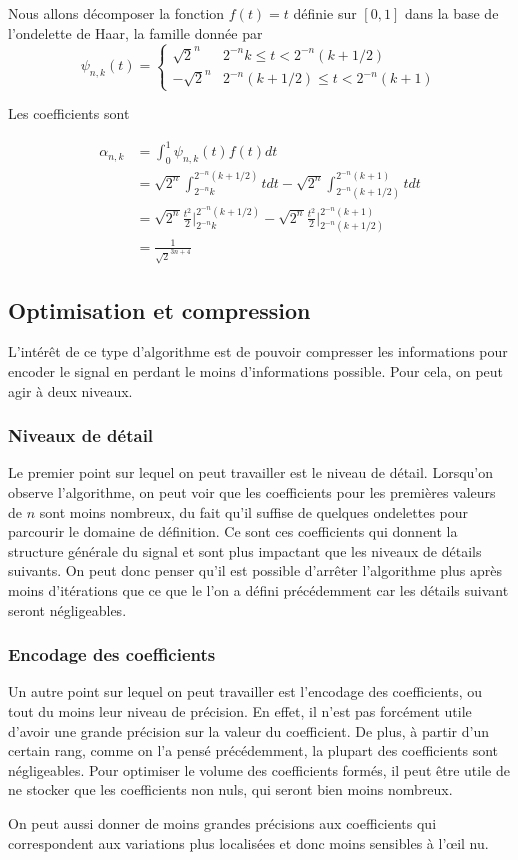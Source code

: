 \begin{myexmpl}
	Nous allons décomposer la fonction $f(t)=t$ définie sur $[0, 1]$ dans la base de l'ondelette de Haar, la famille donnée par
	$$\psi_{n, k}(t) = \left\{
	\begin{array}{cc}
		\sqrt{2}^n & 2^{-n}k \leqslant t < 2^{-n} (k+1/2) \\
		-\sqrt{2}^n & 2^{-n}(k+1/2) \leqslant t < 2^{-n} (k+1)
	\end{array}
	\right.$$
	
	Les coefficients sont 
	
	\begin{align*}
		\alpha_{n, k} &= \int_{0}^{1} \psi_{n, k}(t) f(t) dt \\
		&= \sqrt{2^n} \int_{2^{-n}k}^{2^{-n}(k+1/2)} t dt - \sqrt{2^n} \int_{2^{-n}(k+1/2)}^{2^{-n}(k+1)} t dt \\
		&= \sqrt{2^n} \frac{t^2}{2} \bigg \vert_{2^{-n} k}^{2^{-n}(k+1/2)} - \sqrt{2^n} \frac{t^2}{2} \bigg \vert_{2^{-n} (k+1/2)}^{2^{-n}(k+1)} \\
		&= \frac{1}{\sqrt{2}^{3n + 4}}
	\end{align*}
\end{myexmpl}



\subsection{Optimisation et compression}

L'intérêt de ce type d'algorithme est de pouvoir compresser les informations pour encoder le signal en perdant le moins d'informations possible. Pour cela, on peut agir à deux niveaux.

\subsubsection{Niveaux de détail}
	Le premier point sur lequel on peut travailler est le niveau de détail. Lorsqu'on observe l'algorithme, on peut voir que les coefficients pour les premières valeurs de $n$ sont moins nombreux, du fait qu'il suffise de quelques ondelettes pour parcourir le domaine de définition. Ce sont ces coefficients qui donnent la structure générale du signal et sont plus impactant que les niveaux de détails suivants. On peut donc penser qu'il est possible d'arrêter l'algorithme plus après moins d'itérations que ce que le l'on a défini précédemment car les détails suivant seront négligeables. 

\subsubsection{Encodage des coefficients}
	Un autre point sur lequel on peut travailler est l'encodage des coefficients, ou tout du moins leur niveau de précision. En effet, il n'est pas forcément utile d'avoir une grande précision sur la valeur du coefficient. De plus, à partir d'un certain rang, comme on l'a pensé précédemment, la plupart des coefficients sont négligeables. Pour optimiser le volume des coefficients formés, il peut être utile de ne stocker que les coefficients non nuls, qui seront bien moins nombreux.

	On peut aussi donner de moins grandes précisions aux coefficients qui correspondent aux variations plus localisées et donc moins sensibles à l'œil nu.
	